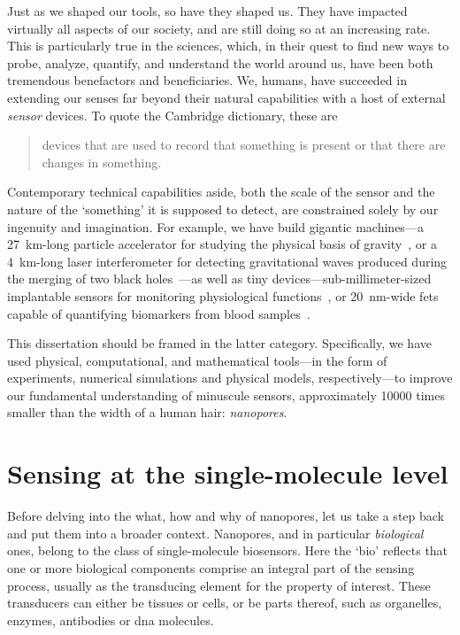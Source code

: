Just as we shaped our tools, so have they shaped us. They have impacted virtually all aspects of our society,
and are still doing so at an increasing rate. This is particularly true in the sciences, which, in their quest
to find new ways to probe, analyze, quantify, and understand the world around us, have been both tremendous
benefactors and beneficiaries. We, humans, have succeeded in extending our senses far beyond their natural
capabilities with a host of external \emph{sensor} devices. To quote the Cambridge dictionary, these are
%
\begin{quote}
  devices that are used to record that something is present or that there are changes in something.
\end{quote}
%
Contemporary technical capabilities aside, both the scale of the sensor and the nature of the `something' it
is supposed to detect, are constrained solely by our ingenuity and imagination. For example, we have build
gigantic machines---a \SI{27}{\kilo\meter}-long particle accelerator for studying the physical basis of
gravity~\cite{ATLAS-2012}, or a \SI{4}{\kilo\meter}-long laser interferometer for detecting gravitational
waves produced during the merging of two black holes~\cite{Abbott-2016}---as well as tiny
devices---sub-millimeter-sized implantable sensors for monitoring physiological functions~\cite{Dong-2019}, or
\SI{20}{\nm}-wide \glspl{fet} capable of quantifying biomarkers from blood samples~\cite{Krivitsky-2016}.

This dissertation should be framed in the latter category. Specifically, we have used physical, computational,
and mathematical tools---in the form of experiments, numerical simulations and physical models,
respectively---to improve our fundamental understanding of minuscule sensors, approximately \num{10000} times
smaller than the width of a human hair: \emph{nanopores}.


%
%
\section{Sensing at the single-molecule level}
%

Before delving into the what, how and why of nanopores, let us take a step back and put them into a broader
context. Nanopores, and in particular \emph{biological} ones, belong to the class of single-molecule
biosensors. Here the `bio' reflects that one or more biological components comprise an integral part of the
sensing process, usually as the transducing element for the property of interest. These transducers can either
be tissues or cells, or be parts thereof, such as organelles, enzymes, antibodies or \gls{dna} molecules.

